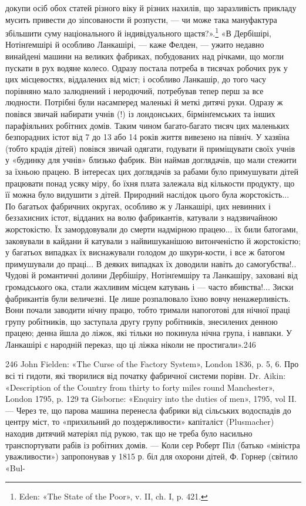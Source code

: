 докупи осіб обох статей різного віку й різних нахилів, що заразливість прикладу мусить привести до
зіпсованости й розпусти, — чи може така мануфактура збільшити суму національного й індивідуального
щастя?».\footnote{
Eden: «The State of the Poor», v. II, ch. I, p. 421.
} «В Дербішірі, Нотінґемшірі й особливо
Ланкашірі, — каже Фелден, — ужито недавно винайдені машини на великих фабриках, побудованих над
річками, що могли пускати в рух водяне колесо. Одразу постала потреба в тисячах робочих рук у цих
місцевостях, віддалених від міст; і особливо
Ланкашір, до того часу порівняно мало залюднений і неродючий, потребував тепер перш за все людности.
Потрібні були насамперед маленькі й меткі дитячі руки. Одразу ж повівся звичай набирати учнів (!) із
лондонських, бірмінґемських та інших парафіяльних робітних домів. Таким чином багато-багато тисяч
цих маленьких безпорадних істот від 7 до 13 або 14 років життя вивезено на північ. У хазяїна (тобто
крадія дітей) повівся звичай одягати, годувати й приміщувати своїх учнів у «будинку для учнів»
близько фабрик. Він наймав доглядачів, що мали стежити за їхньою працею. В інтересах цих доглядачів
за рабами було примушувати дітей працювати понад усяку міру, бо їхня плата залежала від кількости
продукту, що її можна було видушити
з дітей. Природний наслідок цього була жорстокість... По багатьох фабричних округах, особливо ж у
Ланкашірі, цих невинних і беззахисних істот, відданих на волю фабрикантів, катували з надзвичайною
жорстокістю. Їх замордовували до смерти надмірною працею... їх били батогами, заковували в кайдани й
катували з найвишуканішою витонченістю й жорстокістю; у багатьох випадках їх виснажували голодом до
шкури-кости, і все ж батогом примушували до праці... В деяких випадках їх доводили навіть до
самогубства!.. Чудові й романтичні долини Дербішіру, Нотінґемшіру та Ланкашіру, заховані від
громадського ока, стали жахливим місцем катувань і — часто вбивства!... Зиски фабрикантів були
величезні. Це лише розпалювало їхню вовчу ненажерливість. Вони почали заводити нічну працю, тобто
тримали напоготові для нічної праці групу робітників, що заступала другу групу робітників,
знесилених денною працею; денна йшла до ліжок, які тільки но покинула нічна група, і навпаки. У
Ланкашірі є народній переказ, що ці ліжка ніколи не простигали».246

246 John Fielden: «The Curse of the Factory System», London 1836, p. 5, 6. Про всі ті гидоти, які
творилися від початку фабричної системи порівн. Dr. Aikin: «Description of the Country from thirty
to forty miles round Manchester», London 1795, p. 129 та Gisborne: «Enquiry into the duties of men»,
1795, vol II. — Через те, що парова машина перенесла
фабрики від сільських водоспадів до центру міст, то «прихильний до поздержливости» капіталіст
(Plusmacher) находив дитячий матеріял під рукою, так що не треба було насильно транспортувати рабів
із робітних домів. — Коли сер Роберт Піл (батько «міністра уважливости») запропонував у 1815 р. біл
для охорони дітей, Ф. Горнер (світило «Bul-

